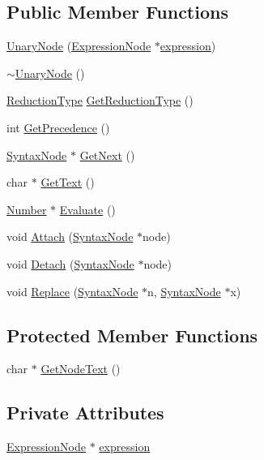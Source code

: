 \subsection*{Public Member Functions}
\begin{DoxyCompactItemize}
\item 
\hyperlink{classUnaryNode_a6d08d4e122b413b28e5163900800ff66}{Unary\+Node} (\hyperlink{classExpressionNode}{Expression\+Node} $\ast$\hyperlink{classUnaryNode_a8041eeaa6edd32c1a2474c504de2889d}{expression})
\item 
\hyperlink{classUnaryNode_ab598f874161ee54d0f4524bcef88126d}{$\sim$\+Unary\+Node} ()
\item 
\hyperlink{nodes_8h_ab321a69ad5704b704b8dd9e1b3984a29}{Reduction\+Type} \hyperlink{classUnaryNode_af0a3f842557e89f22bb14d1124a57a80}{Get\+Reduction\+Type} ()
\item 
int \hyperlink{classUnaryNode_a6717d15d53d59718c772dab8f8393f13}{Get\+Precedence} ()
\item 
\hyperlink{classSyntaxNode}{Syntax\+Node} $\ast$ \hyperlink{classUnaryNode_aea757690dc96439db3d88a69321c605a}{Get\+Next} ()
\item 
char $\ast$ \hyperlink{classUnaryNode_ad753fe89681dca1cf2d9ee840aedf86b}{Get\+Text} ()
\item 
\hyperlink{structNumber}{Number} $\ast$ \hyperlink{classUnaryNode_af78161ffb449b18c406c46defe6fa9b3}{Evaluate} ()
\item 
void \hyperlink{classUnaryNode_ab3290a52eba94622c917f0f701883aad}{Attach} (\hyperlink{classSyntaxNode}{Syntax\+Node} $\ast$node)
\item 
void \hyperlink{classUnaryNode_ad5ed9848bc7cdb4911a79f86ec3e8a43}{Detach} (\hyperlink{classSyntaxNode}{Syntax\+Node} $\ast$node)
\item 
void \hyperlink{classUnaryNode_a82d9151314ef46f671da1127b98b7789}{Replace} (\hyperlink{classSyntaxNode}{Syntax\+Node} $\ast$n, \hyperlink{classSyntaxNode}{Syntax\+Node} $\ast$x)
\end{DoxyCompactItemize}
\subsection*{Protected Member Functions}
\begin{DoxyCompactItemize}
\item 
char $\ast$ \hyperlink{classUnaryNode_ac3a91d51907bdc5a1cc781d8b0d0c0c2}{Get\+Node\+Text} ()
\end{DoxyCompactItemize}
\subsection*{Private Attributes}
\begin{DoxyCompactItemize}
\item 
\hyperlink{classExpressionNode}{Expression\+Node} $\ast$ \hyperlink{classUnaryNode_a8041eeaa6edd32c1a2474c504de2889d}{expression}
\end{DoxyCompactItemize}
